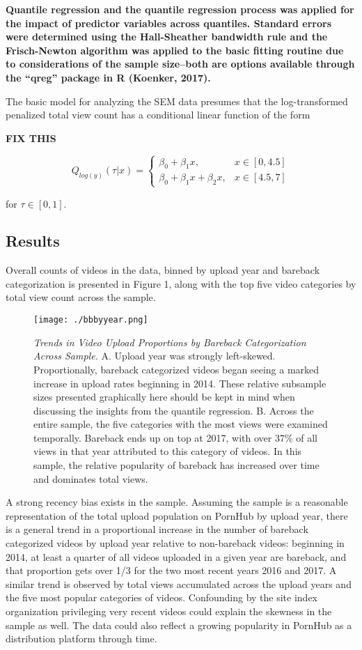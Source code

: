 \documentclass[]{article}
\begin{document}
\textbf{Quantile regression and the quantile regression process was
applied for the impact of predictor variables across quantiles. Standard
errors were determined using the Hall-Sheather bandwidth rule and the
Frisch-Newton algorithm was applied to the basic fitting routine due to
considerations of the sample size--both are options available through
the ``qreg'' package in R (Koenker, 2017).}

The basic model for analyzing the SEM data presumes that the
log-transformed penalized total view count has a conditional linear
function of the form

\textbf{FIX THIS}

\[Q_{log(y)} \left ( \tau |x \right )= \left\{\begin{matrix} \beta _{0} + \beta _{1}x, & x \in \left [0,4.5  \right ]\\ \beta _{0} + \beta _{1}x + \beta _{2}x, & x \in \left [4.5,7  \right ] \end{matrix}\right.\]

for \(\tau \in \left [0,1 \right ]\).

\subsection{Results}\label{results}

Overall counts of videos in the data, binned by upload year and bareback
categorization is presented in Figure 1, along with the top five video
categories by total view count across the sample.

\begin{figure}
\centering
\texttt{[image: ./bbbyyear.png]}
\caption{\emph{Trends in Video Upload Proportions by Bareback
Categorization Across Sample.} A. Upload year was strongly left-skewed.
Proportionally, bareback categorized videos began seeing a marked
increase in upload rates beginning in 2014. These relative subsample
sizes presented graphically here should be kept in mind when discussing
the insights from the quantile regression. B. Across the entire sample,
the five categories with the most views were examined temporally.
Bareback ends up on top at 2017, with over 37\% of all views in that
year attributed to this category of videos. In this sample, the relative
popularity of bareback has increased over time and dominates total
views.}
\end{figure}

A strong recency bias exists in the sample. Assuming the sample is a
reasonable representation of the total upload population on PornHub by
upload year, there is a general trend in a proportional increase in the
number of bareback categorized videos by upload year relative to
non-bareback videos: beginning in 2014, at least a quarter of all videos
uploaded in a given year are bareback, and that proportion gets over 1/3
for the two most recent years 2016 and 2017. A similar trend is observed
by total views accumulated across the upload years and the five most
popular categories of videos. Confounding by the site index organization
privileging very recent videos could explain the skewness in the sample
as well. The data could also reflect a growing popularity in PornHub as
a distribution platform through time.
\end{document}
